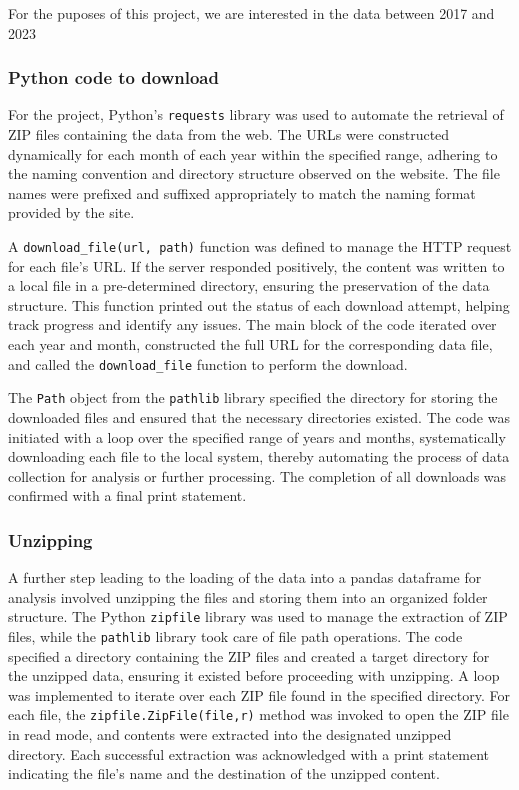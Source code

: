 \documentclass[
]{article}
\begin{document}
For the puposes of this project, we are interested in the data between
2017 and 2023

\subsubsection{Python code to download}\label{python-code-to-download}

For the project, Python's \texttt{requests} library was used to automate
the retrieval of ZIP files containing the data from the web. The URLs
were constructed dynamically for each month of each year within the
specified range, adhering to the naming convention and directory
structure observed on the website. The file names were prefixed and
suffixed appropriately to match the naming format provided by the site.

A \texttt{download\_file(url,\ path)} function was defined to manage the
HTTP request for each file's URL. If the server responded positively,
the content was written to a local file in a pre-determined directory,
ensuring the preservation of the data structure. This function printed
out the status of each download attempt, helping track progress and
identify any issues. The main block of the code iterated over each year
and month, constructed the full URL for the corresponding data file, and
called the \texttt{download\_file} function to perform the download.

The \texttt{Path} object from the \texttt{pathlib} library specified the
directory for storing the downloaded files and ensured that the
necessary directories existed. The code was initiated with a loop over
the specified range of years and months, systematically downloading each
file to the local system, thereby automating the process of data
collection for analysis or further processing. The completion of all
downloads was confirmed with a final print statement.

\subsubsection{Unzipping}\label{unzipping}

A further step leading to the loading of the data into a pandas
dataframe for analysis involved unzipping the files and storing them
into an organized folder structure. The Python \texttt{zipfile} library
was used to manage the extraction of ZIP files, while the
\texttt{pathlib} library took care of file path operations. The code
specified a directory containing the ZIP files and created a target
directory for the unzipped data, ensuring it existed before proceeding
with unzipping. A loop was implemented to iterate over each ZIP file
found in the specified directory. For each file, the
\texttt{zipfile.ZipFile(file,\textquotesingle{}r\textquotesingle{})}
method was invoked to open the ZIP file in read mode, and contents were
extracted into the designated unzipped directory. Each successful
extraction was acknowledged with a print statement indicating the file's
name and the destination of the unzipped content.
\end{document}

